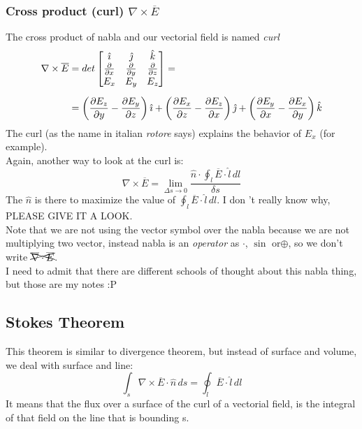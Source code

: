 \subsubsection*{Cross product (curl) $\nabla \times \overline{E}$}
The cross product of nabla and our vectorial field is named \emph{curl}
\begin{align}
    \begin{split}
        \nabla\times \overline{E}&=det
        \left[ \begin{matrix}
        \hat{\imath} & \hat{\jmath} & \hat{\mathnormal{k}}\\
        \frac{\partial}{\partial x} & \frac{\partial}{\partial y} & \frac{\partial}{\partial z}\\
        E_x & E_y & E_z
        \end{matrix}\right]=\\[5pt]
        &=\left(\frac{\partial E_z}{\partial y} - \frac{\partial E_y}{\partial z}\right)\hat{\imath}+
        \left(\frac{\partial E_x}{\partial z} - \frac{\partial E_z}{\partial x}\right)\hat{\jmath}+
        \left(\frac{\partial E_y}{\partial x} - \frac{\partial E_x}{\partial y}\right)\hat{\mathnormal{k}}
    \end{split}
\end{align}
The curl (as the name in italian \emph{rotore} says) explains the behavior of $E_x$ (for example).\\
Again, another way to look at the curl is:
\begin{equation}
\nabla \times \overline{E}=\lim_{\Delta s \rightarrow 0}\frac{\hat{n}\cdot\oint_l \overline{E}\cdot \hat{l}\,dl}{\delta s}
\end{equation}
The $\hat{n}$ is there to maximize the value of $\oint_l \overline{E}\cdot \hat{l}\,dl$. I don
't really know why, PLEASE GIVE IT A LOOK.\\
Note that we are not using the vector symbol over the nabla because we are not multiplying two vector, instead nabla is an \emph{operator} as $\cdot$, $\sin$ or$\oplus$, so we don't write $\xcancel{\overline{\nabla}\cdot\overline{E}}$.\\
I need to admit that there are different schools of thought about this nabla thing, but those are my notes :P
\subsection*{Stokes Theorem}
This theorem is similar to divergence theorem, but instead of surface and volume, we deal with surface and line:
\begin{equation}\label{eq:stokes_eq}
\int_s \nabla\times \overline{E}\cdot \hat{n}\,ds=\oint_l\overline{E}\cdot\hat{l}\,dl
\end{equation}
It means that the flux over a surface of the curl of a vectorial field, is the integral of that field on the line that is bounding s.
